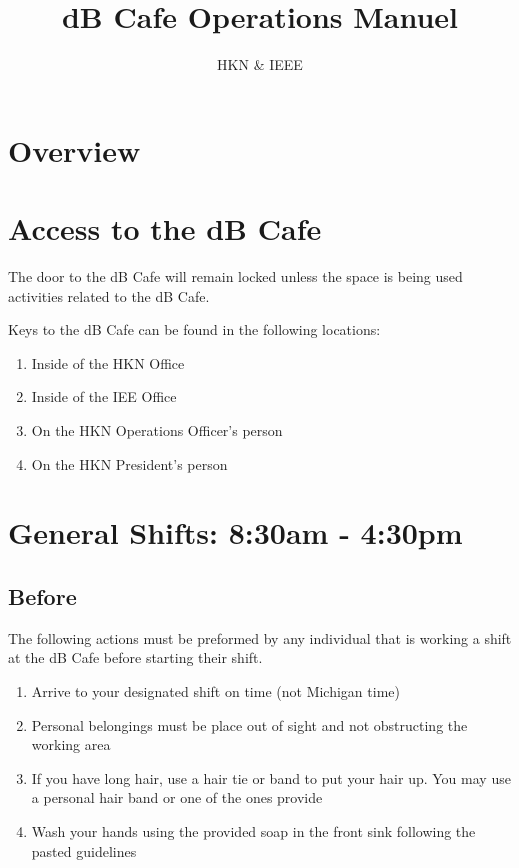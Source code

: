 \documentclass[12pt,onecolumn,letterpaper]{article}
\title{dB Cafe Operations Manuel}
\author{HKN \& IEEE}
\date{ }
\begin{document}
\maketitle
\tableofcontents
\newpage

\section{Overview}

\section{Access to the dB Cafe}
The door to the dB Cafe will remain locked unless the space is being used activities related to the dB Cafe.

Keys to the dB Cafe can be found in the following locations:
\begin{enumerate}
\item Inside of the HKN Office
\item Inside of the IEE Office
\item On the HKN Operations Officer's person
\item On the HKN President's person
\end{enumerate}

\section{General Shifts: 8:30am - 4:30pm}
\subsection{Before}
The following actions must be preformed by any individual that is working a shift at the dB Cafe before starting their shift.
\begin{enumerate}
\item Arrive to your designated shift on time (not Michigan time)
\item Personal belongings must be place out of sight and not obstructing the working area
\item If you have long hair, use a hair tie or band to put your hair up. You may use a personal hair band or one of the ones provide
\item Wash your hands using the provided soap in the front sink following the pasted guidelines
\end{enumerate}
\end{document}
